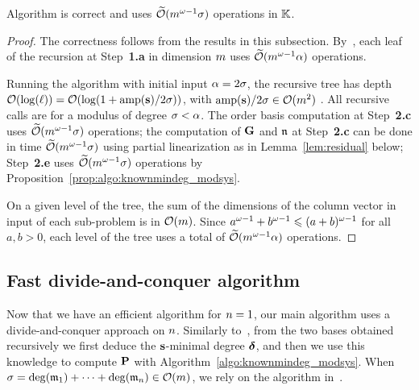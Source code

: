 \documentclass[preprint]{sig-alternate-05-2015}
\begin{document}
\vspace{-0.2cm}
\begin{prop}
  \label{prop:modsys_one}
  Algorithm  is correct and uses
  $\softO{\nbun^{\expmatmul-1} \degMod}$ operations in $\field$.
\end{prop}
\begin{proof}
  \vspace{-0.1cm}
  The correctness follows from the results in this subsection.
  By~\cite[Theorem~1.4]{JeNeScVi16}, each leaf of the recursion
  at Step~\textbf{1.a} in dimension $\nbun$ uses $\softO{\nbun^{\expmatmul-1}
  \alpha}$ operations.

  Running the algorithm with initial input $\alpha = 2\degMod$, the recursive
  tree has depth $\bigO{\log(\ell)} = \bigO{\log(1 + \amp / 2\degMod)}$, with
  $\amp / 2\degMod \in \bigO{\nbun^2}$ \cite[Appendix A]{JeNeScVi16}. All
  recursive calls are for a modulus of degree $\degMod < \alpha$.  The order
  basis computation at Step~\textbf{2.c} uses $\softO{\nbun^{\expmatmul-1}
  \degMod}$ operations; the computation of $\mat{G}$ and $\modulus[n]$ at
  Step~\textbf{2.c} can be done in time $\softO{\nbun^{\expmatmul-1} \degMod}$
  using partial linearization as in Lemma~\ref{lem:residual} below;
  Step~\textbf{2.e} uses $\softO{\nbun^{\expmatmul-1} \degMod}$ operations by
  Proposition~\ref{prop:algo:knownmindeg_modsys}.

 On a given level of the tree, the sum of the dimensions of the column vector
 in input of each sub-problem is in $\bigO{\nbun}$. Since $a^{\expmatmul-1} +
 b^{\expmatmul-1} \le (a+b)^{\expmatmul-1}$ for all $a,b>0$, each level of the
 tree uses a total of $\softO{\nbun^{\expmatmul-1} \alpha}$ operations.
 \vspace{-0.1cm}
\end{proof}

\subsection{Fast divide-and-conquer algorithm}
\label{subsec:algo:modsys}

Now that we have an efficient algorithm for $\nbeq=1$, our main algorithm uses
a divide-and-conquer approach on $\nbeq$. Similarly to~\cite[Algorithm
1]{JeNeScVi16}, from the two bases obtained recursively we first deduce the
$\shifts$-minimal degree $\minDegs$, and then we use this knowledge to compute
$\msb$ with Algorithm~\ref{algo:knownmindeg_modsys}. When $\degMod =
\deg(\modulus_1) + \cdots + \deg(\modulus_\nbeq) \in \bigO{\nbun}$, we rely on
the algorithm  in~\cite[Algorithm~9]{JeNeScVi15}.
\end{document}
